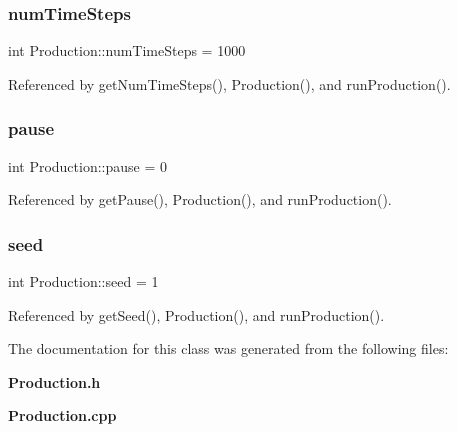 \subsubsection{num\+Time\+Steps}
{\footnotesize\ttfamily int Production\+::num\+Time\+Steps = 1000\hspace{0.3cm}{\ttfamily [private]}}



Referenced by get\+Num\+Time\+Steps(), Production(), and run\+Production().

\mbox{\label{classProduction_af570feb7415a4d5b1a9176dacd9d6b64}} 
\subsubsection{pause}
{\footnotesize\ttfamily int Production\+::pause = 0\hspace{0.3cm}{\ttfamily [private]}}



Referenced by get\+Pause(), Production(), and run\+Production().

\mbox{\label{classProduction_adb474287b0143fccb9d440ccc54ba624}} 
\subsubsection{seed}
{\footnotesize\ttfamily int Production\+::seed = 1\hspace{0.3cm}{\ttfamily [private]}}



Referenced by get\+Seed(), Production(), and run\+Production().



The documentation for this class was generated from the following files\+:\begin{DoxyCompactItemize}
\item 
\textbf{ Production.\+h}\item 
\textbf{ Production.\+cpp}\end{DoxyCompactItemize}
